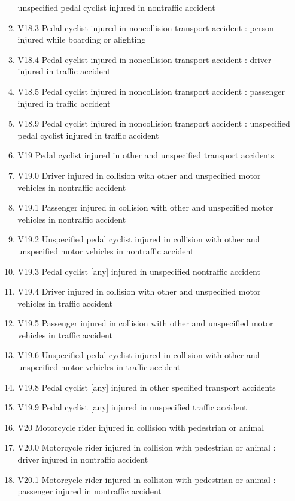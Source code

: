 \documentclass[
]{scrartcl}
\begin{document}
\begin{itemize}
\begin{enumerate}
    unspecified pedal cyclist injured in nontraffic accident
  \item
    V18.3 Pedal cyclist injured in noncollision transport accident :
    person injured while boarding or alighting
  \item
    V18.4 Pedal cyclist injured in noncollision transport accident :
    driver injured in traffic accident
  \item
    V18.5 Pedal cyclist injured in noncollision transport accident :
    passenger injured in traffic accident
  \item
    V18.9 Pedal cyclist injured in noncollision transport accident :
    unspecified pedal cyclist injured in traffic accident
  \item
    V19 Pedal cyclist injured in other and unspecified transport
    accidents
  \item
    V19.0 Driver injured in collision with other and unspecified motor
    vehicles in nontraffic accident
  \item
    V19.1 Passenger injured in collision with other and unspecified
    motor vehicles in nontraffic accident
  \item
    V19.2 Unspecified pedal cyclist injured in collision with other and
    unspecified motor vehicles in nontraffic accident
  \item
    V19.3 Pedal cyclist {[}any{]} injured in unspecified nontraffic
    accident
  \item
    V19.4 Driver injured in collision with other and unspecified motor
    vehicles in traffic accident
  \item
    V19.5 Passenger injured in collision with other and unspecified
    motor vehicles in traffic accident
  \item
    V19.6 Unspecified pedal cyclist injured in collision with other and
    unspecified motor vehicles in traffic accident
  \item
    V19.8 Pedal cyclist {[}any{]} injured in other specified transport
    accidents
  \item
    V19.9 Pedal cyclist {[}any{]} injured in unspecified traffic
    accident
  \item
    V20 Motorcycle rider injured in collision with pedestrian or animal
  \item
    V20.0 Motorcycle rider injured in collision with pedestrian or
    animal : driver injured in nontraffic accident
  \item
    V20.1 Motorcycle rider injured in collision with pedestrian or
    animal : passenger injured in nontraffic accident

\end{enumerate}
\end{itemize}
\end{document}
